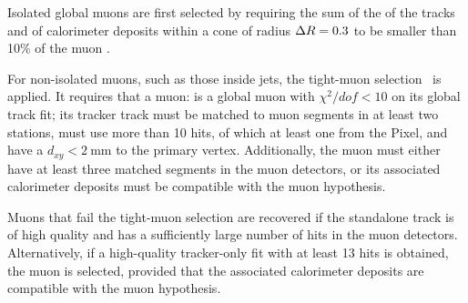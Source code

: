 Isolated global muons are first selected by requiring the
sum of the \pt of the tracks and \ET of calorimeter deposits
within a cone of radius $\Delta R = 0.3$ to be smaller than 10\usep\% of the muon \pt.

For non-isolated muons, such as those inside jets, the tight-muon selection~\cite{CMS-MUO-10-004} is applied.
It requires that a muon:
is a global muon with $\chi^2/dof < 10$ on its global track fit;
its tracker track must be matched to muon segments in at least two stations,
must use more than 10 hits,
of which at least one from the Pixel,
and have a $d_{xy} < 2~\text{mm}$ to the primary vertex.
Additionally, the muon must either have at least three matched segments in the muon detectors,
or its associated calorimeter deposits must be compatible with the muon hypothesis.

Muons that fail the tight-muon selection are recovered if the standalone track is of high quality
and has a sufficiently large number of hits in the muon detectors.
Alternatively, if a high-quality tracker-only fit with at least 13 hits is obtained,
the muon is selected, provided that the associated calorimeter deposits are compatible with the muon hypothesis.
